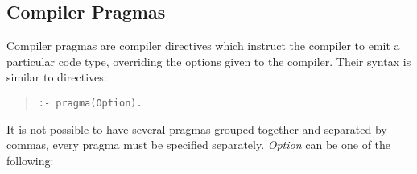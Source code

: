 \subsection{Compiler Pragmas}
Compiler pragmas are compiler directives which instruct the compiler
to emit a particular code type, overriding the options given to the compiler.
Their syntax is similar to directives:
\begin{quote}
\begin{verbatim}
:- pragma(Option).
\end{verbatim}
\end{quote}
It is not possible to have several pragmas grouped together and separated
by commas, every pragma must be specified separately.
{\it Option} can be one of the following:
